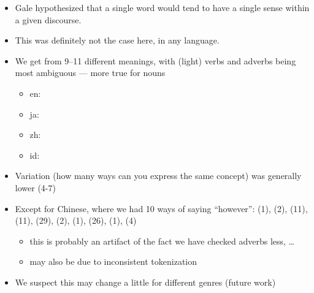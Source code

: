 \documentclass[a4paper,landscape,headrule,footrule,xetex]{foils}
\begin{document}
 \begin{itemize}
  \item Gale hypothesized that a
    single word would tend to have a single sense within a given
    discourse. 
  \item   This was definitely not the case here, in any language.
  \item We get from 9--11 different meanings, with (light) verbs and adverbs
    being most ambiguous --- more true for nouns
    \begin{itemize}
    \item en: 
    \item ja: 
    \item zh: 
    \item id: 
    \end{itemize}
  \end{itemize}

 \begin{itemize}
 \item Variation (how many ways can you express the same concept) was
   generally lower (4-7)
 \item Except for Chinese, where we had 10 ways of
   saying ``however'':   (1),  (2),  (11),
    (11),  (29),  (2),  (1),
    (26),  (1),  (4)
   \begin{itemize}
   \item this is probably an artifact of the fact we have checked
     adverbs less, \ldots
   \item may also be due to inconsistent tokenization
   \end{itemize}
 \item We suspect this may change a little for different genres
   (future work)
 \end{itemize}

\end{document}

